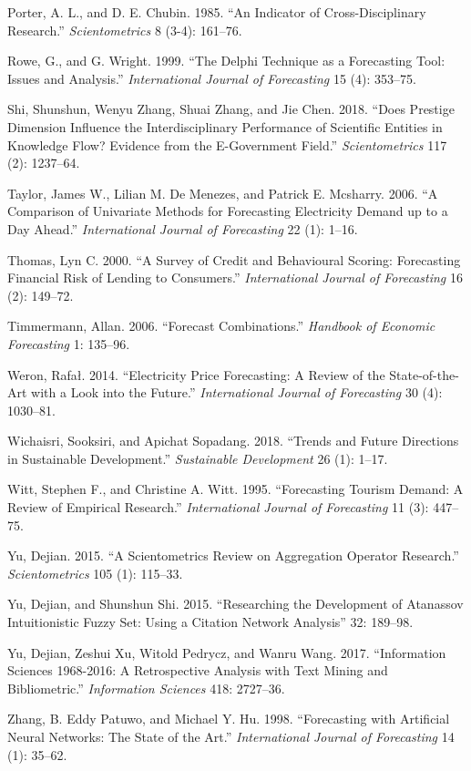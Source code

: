 \documentclass[11pt,a4paper]{elsarticle} %
\begin{document}
\hypertarget{ref-Porter1985An}{}
Porter, A. L., and D. E. Chubin. 1985. ``An Indicator of
Cross-Disciplinary Research.'' \emph{Scientometrics} 8 (3-4): 161--76.

\hypertarget{ref-Rowe1999The}{}
Rowe, G., and G. Wright. 1999. ``The Delphi Technique as a Forecasting
Tool: Issues and Analysis.'' \emph{International Journal of Forecasting}
15 (4): 353--75.

\hypertarget{ref-Shi2018Does}{}
Shi, Shunshun, Wenyu Zhang, Shuai Zhang, and Jie Chen. 2018. ``Does
Prestige Dimension Influence the Interdisciplinary Performance of
Scientific Entities in Knowledge Flow? Evidence from the E-Government
Field.'' \emph{Scientometrics} 117 (2): 1237--64.

\hypertarget{ref-Taylor2006}{}
Taylor, James W., Lilian M. De Menezes, and Patrick E. Mcsharry. 2006.
``A Comparison of Univariate Methods for Forecasting Electricity Demand
up to a Day Ahead.'' \emph{International Journal of Forecasting} 22 (1):
1--16.

\hypertarget{ref-Thomas2000A}{}
Thomas, Lyn C. 2000. ``A Survey of Credit and Behavioural Scoring:
Forecasting Financial Risk of Lending to Consumers.''
\emph{International Journal of Forecasting} 16 (2): 149--72.

\hypertarget{ref-Timmermann2006}{}
Timmermann, Allan. 2006. ``Forecast Combinations.'' \emph{Handbook of
Economic Forecasting} 1: 135--96.

\hypertarget{ref-Weron2014Electricity}{}
Weron, Rafał. 2014. ``Electricity Price Forecasting: A Review of the
State-of-the-Art with a Look into the Future.'' \emph{International
Journal of Forecasting} 30 (4): 1030--81.

\hypertarget{ref-Wichaisri2018Trends}{}
Wichaisri, Sooksiri, and Apichat Sopadang. 2018. ``Trends and Future
Directions in Sustainable Development.'' \emph{Sustainable Development}
26 (1): 1--17.

\hypertarget{ref-Witt1995Forecasting}{}
Witt, Stephen F., and Christine A. Witt. 1995. ``Forecasting Tourism
Demand: A Review of Empirical Research.'' \emph{International Journal of
Forecasting} 11 (3): 447--75.

\hypertarget{ref-Yu2015A}{}
Yu, Dejian. 2015. ``A Scientometrics Review on Aggregation Operator
Research.'' \emph{Scientometrics} 105 (1): 115--33.

\hypertarget{ref-Yu2015Researching}{}
Yu, Dejian, and Shunshun Shi. 2015. ``Researching the Development of
Atanassov Intuitionistic Fuzzy Set: Using a Citation Network Analysis''
32: 189--98.

\hypertarget{ref-Yu2017Information}{}
Yu, Dejian, Zeshui Xu, Witold Pedrycz, and Wanru Wang. 2017.
``Information Sciences 1968-2016: A Retrospective Analysis with Text
Mining and Bibliometric.'' \emph{Information Sciences} 418: 2727--36.

\hypertarget{ref-Zhang1998}{}
Zhang, B. Eddy Patuwo, and Michael Y. Hu. 1998. ``Forecasting with
Artificial Neural Networks: The State of the Art.'' \emph{International
Journal of Forecasting} 14 (1): 35--62.
\end{document}
